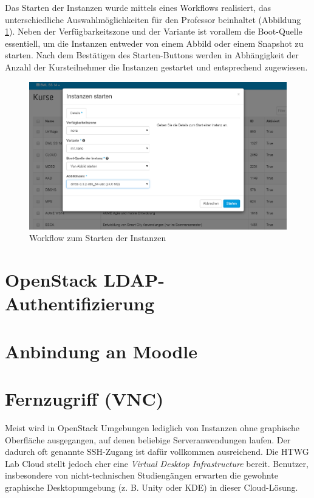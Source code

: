 Das Starten der Instanzen wurde mittels eines Workflows realisiert, das unterschiedliche Auswahlmöglichkeiten für den Professor beinhaltet (Abbildung \ref{dashboard-start-instances}). Neben der Verfügbarkeitszone und der Variante ist vorallem die Boot-Quelle essentiell, um die Instanzen entweder von einem Abbild oder einem Snapshot zu starten. Nach dem Bestätigen des Starten-Buttons werden in Abhängigkeit der Anzahl der Kursteilnehmer die Instanzen gestartet und entsprechend zugewiesen.

\begin{figure}[H]
\centering
\includegraphics[scale=0.25]{img/dashboard-start-instances.png}
\caption{Workflow zum Starten der Instanzen}
\label{dashboard-start-instances}
\end{figure}

\section{OpenStack LDAP-Authentifizierung}\label{ldap_auth1}

\section{Anbindung an Moodle}


\section{Fernzugriff (VNC)}

Meist wird in OpenStack Umgebungen lediglich von Instanzen ohne graphische Oberfläche ausgegangen, auf denen beliebige Serveranwendungen laufen. 
Der dadurch oft genannte SSH-Zugang ist dafür vollkommen ausreichend.
Die HTWG Lab Cloud stellt jedoch eher eine \emph{Virtual Desktop Infrastructure} bereit.
Benutzer, insbesondere von nicht-technischen Studiengängen erwarten die gewohnte graphische Desktopumgebung (z. B. Unity oder KDE) in dieser Cloud-Lösung.

